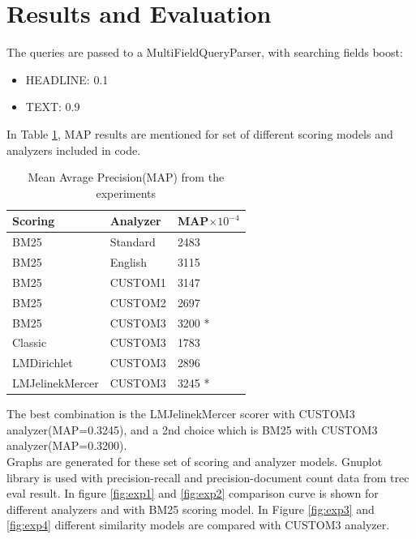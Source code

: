 \section{Results and Evaluation}

The queries are passed to a MultiFieldQueryParser, with searching fields boost:

\begin{itemize}
    \item HEADLINE: 0.1
    \item TEXT: 0.9
\end{itemize}
\vspace{.07cm}
In Table \ref{tab:maps}, MAP results are mentioned for set of different scoring models and analyzers included in code.
\begin{table}[!htbp]
  \caption{Mean Avrage Precision(MAP) from the experiments}
  \label{tab:maps}
  \centering
  \renewcommand{\tabularxcolumn}{m} %
  \begin{tabularx}{0.8\linewidth}{l | l | l}
    \toprule
    Scoring         & Analyzer & MAP$\times 10^{-4}$
    \tabularnewline \hline
    BM25            & Standard & 2483
    \tabularnewline \hline
    BM25            & English  & 3115
    \tabularnewline \hline
    BM25            & CUSTOM1  & 3147
    \tabularnewline \hline
    BM25            & CUSTOM2  & 2697
    \tabularnewline \hline
    BM25            & CUSTOM3  & 3200 *
    \tabularnewline \hline
    Classic         & CUSTOM3  & 1783
    \tabularnewline \hline
    LMDirichlet     & CUSTOM3  & 2896
    \tabularnewline \hline
    LMJelinekMercer & CUSTOM3  & 3245 *
    \tabularnewline \bottomrule
  \end{tabularx}
\end{table}
\newline
The best combination is the LMJelinekMercer scorer with CUSTOM3 analyzer(MAP=0.3245), and a 2nd choice which is BM25 with CUSTOM3 analyzer(MAP=0.3200).
\newline
\\
Graphs are generated for these set of scoring and analyzer models. Gnuplot\cite{gnuplot} library is used with precision-recall and precision-document count data from trec eval\cite{trec_eval} result.
In figure \ref{fig:exp1} and \ref{fig:exp2} comparison curve is shown for different analyzers and with BM25 scoring model. In Figure \ref{fig:exp3} and \ref{fig:exp4} different similarity models  are compared with CUSTOM3 analyzer.
\vspace{15mm}
\newline
